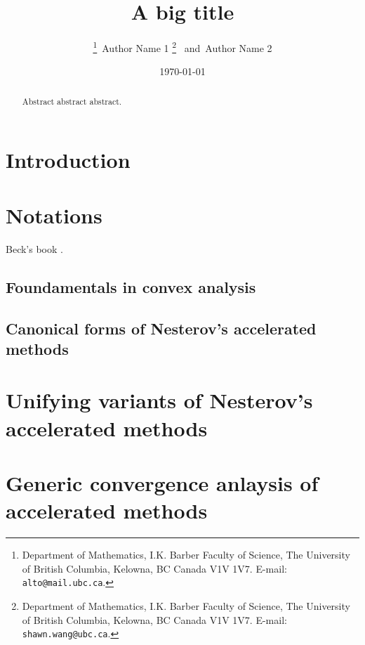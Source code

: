 \documentclass[12pt]{article}
\begin{document}
\title{
    {
        \selectfont 
        A big title
    }
    }

\author{
    \thanks{Department of Mathematics, I.K. Barber Faculty of Science,
    The University of British Columbia, Kelowna, BC Canada V1V 1V7. 
    E-mail:  \texttt{alto@mail.ubc.ca}.}~Author Name 1
    \thanks{Department of Mathematics, I.K. Barber Faculty of Science,
    The University of British Columbia, Kelowna, BC Canada V1V 1V7. 
    E-mail:  \texttt{shawn.wang@ubc.ca}.}~ and~Author Name 2
}

\date{\today}

\maketitle


\begin{abstract} 
    \noindent
    Abstract abstract abstract. 
\end{abstract}


\tableofcontents

\section{Introduction}

\section{Notations}
    Beck's book \cite{beck_first-order_2017}. 
\subsection{Foundamentals in convex analysis}
\subsection{Canonical forms of Nesterov's accelerated methods}
\section{Unifying variants of Nesterov's accelerated methods}
\section{Generic convergence anlaysis of accelerated methods}
\end{document}

